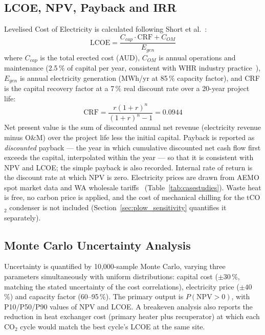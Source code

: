 \subsection{LCOE, NPV, Payback and IRR}

Levelised Cost of Electricity is calculated following Short et
al.~\cite{Short1995}:
\begin{equation}
\mathrm{LCOE} = \frac{C_{cap} \cdot \mathrm{CRF} + C_{OM}}{E_{gen}}
\label{eq:lcoe}
\end{equation}
where $C_{cap}$ is the total erected cost (AUD), $C_{OM}$ is annual
operations and maintenance (2.5\,\% of capital per year, consistent with WHR
industry practice~\cite{Baglietto2023}), $E_{gen}$ is annual electricity
generation (MWh/yr at 85\,\% capacity factor), and CRF is the capital
recovery factor at a 7\,\% real discount rate over a 20-year project life:
\begin{equation}
\mathrm{CRF} = \frac{r(1+r)^n}{(1+r)^n - 1} = 0.0944
\label{eq:crf}
\end{equation}
Net present value is the sum of discounted annual net revenue (electricity
revenue minus O\&M) over the project life less the initial capital. Payback
is reported as \emph{discounted} payback --- the year in which cumulative
discounted net cash flow first exceeds the capital, interpolated within the
year --- so that it is consistent with NPV and LCOE; the simple payback is
also recorded. Internal rate of return is the discount rate at which NPV is
zero. Electricity prices are drawn from AEMO spot market data and WA
wholesale tariffs~\cite{AEMO2024} (Table~\ref{tab:casestudies}). Waste heat
is free, no carbon price is applied, and the cost of mechanical chilling for
the tCO$_2$ condenser is not included (Section~\ref{sec:plow_sensitivity}
quantifies it separately).

\subsection{Monte Carlo Uncertainty Analysis}

Uncertainty is quantified by 10,000-sample Monte Carlo, varying three
parameters simultaneously with uniform distributions: capital cost
($\pm 30$\,\%, matching the stated uncertainty of the cost correlations),
electricity price ($\pm 40$\,\%) and capacity factor (60--95\,\%). The
primary output is $P(\mathrm{NPV} > 0)$, with P10/P50/P90 values of NPV and
LCOE. A breakeven analysis also reports the reduction in heat exchanger cost
(primary heater plus recuperator) at which each CO$_2$ cycle would match the
best cycle's LCOE at the same site.

